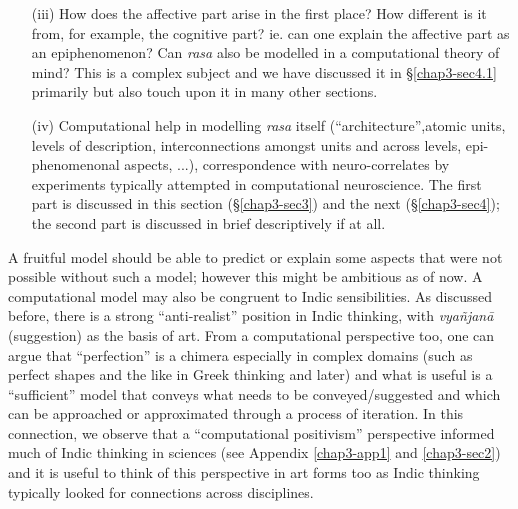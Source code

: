 \begin{itemize}
\item[(iii)] How does the affective part arise in the first place? How different is it from, for example, the cognitive part? ie. can one explain the affective part as an epiphenomenon? Can \textsl{rasa} also be modelled in a computational theory of mind? This is a complex subject and we have discussed it in \S\ref{chap3-sec4.1} primarily but also touch upon it in many other sections.

\item[(iv)] Computational help in modelling \textsl{rasa} itself (“architecture”,\break atomic units, levels of description, interconnections amongst units and across levels, epi-phenomenonal aspects, ...), correspondence with neuro-correlates by experiments typically attempted in computational neuroscience. The first part is discussed in this section (\S\ref{chap3-sec3}) and the next (\S\ref{chap3-sec4}); the second part is discussed in brief descriptively if at all.
\end{itemize}

A fruitful model should be able to predict or explain some aspects that were not possible without such a model; however this might be ambitious as of now. A computational model may also be congruent to Indic sensibilities. As discussed before, there is a strong “anti-realist” position in Indic thinking, with \textsl{vyañjanā} (suggestion) as the basis of art. From a computational perspective too, one can argue that “perfection” is a chimera especially in complex domains (such as perfect shapes and the like in Greek thinking and later) and what is useful is a “sufficient” model that conveys what needs to be conveyed/suggested and which can be approached or approximated through a process of iteration. In this connection, we observe that a “computational positivism” perspective informed much of Indic thinking in sciences (see Appendix \ref{chap3-app1} and \ref{chap3-sec2}) and it is useful to think of this perspective in art forms too as Indic thinking typically looked for connections across disciplines.

